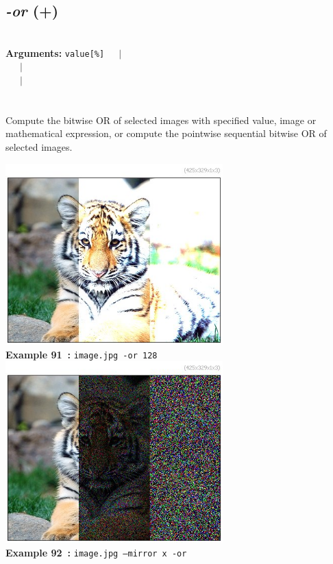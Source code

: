 \documentclass[a4paper,11pt,twoside]{book}
\begin{document}
\subsection{\emph{-or} (+)}\vspace*{-0.5em}
~\\\textbf{Arguments: } 
{\small \texttt{value[\%]}}~~~$|$\\
\hspace*{2.2cm}{\small \texttt{[image]}}~~~$|$\\
~~~$|$\\
\\~\\
Compute the bitwise OR of selected images with specified value, image or mathematical
expression, or compute the pointwise sequential bitwise OR of selected images.
\begin{center}\includegraphics[keepaspectratio=true,height=7cm,width=\textwidth]{img/gmic_def91.jpg}\\
{\footnotesize \textbf{Example 91~:} \texttt{image.jpg -or 128}}
\\\includegraphics[keepaspectratio=true,height=7cm,width=\textwidth]{img/gmic_def92.jpg}\\
{\footnotesize \textbf{Example 92~:} \texttt{image.jpg --mirror x -or}}
\end{center}
\end{document}
